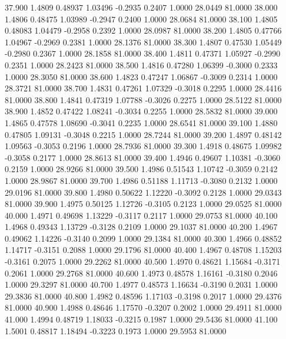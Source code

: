   37.900   1.4809   0.48937   1.03496  -0.2935   0.2407   1.0000  28.0449  81.0000
  38.000   1.4806   0.48475   1.03989  -0.2947   0.2400   1.0000  28.0684  81.0000
  38.100   1.4805   0.48083   1.04479  -0.2958   0.2392   1.0000  28.0987  81.0000
  38.200   1.4805   0.47766   1.04967  -0.2969   0.2381   1.0000  28.1376  81.0000
  38.300   1.4807   0.47530   1.05449  -0.2980   0.2367   1.0000  28.1858  81.0000
  38.400   1.4811   0.47371   1.05927  -0.2990   0.2351   1.0000  28.2423  81.0000
  38.500   1.4816   0.47280   1.06399  -0.3000   0.2333   1.0000  28.3050  81.0000
  38.600   1.4823   0.47247   1.06867  -0.3009   0.2314   1.0000  28.3721  81.0000
  38.700   1.4831   0.47261   1.07329  -0.3018   0.2295   1.0000  28.4416  81.0000
  38.800   1.4841   0.47319   1.07788  -0.3026   0.2275   1.0000  28.5122  81.0000
  38.900   1.4852   0.47422   1.08241  -0.3034   0.2255   1.0000  28.5832  81.0000
  39.000   1.4865   0.47578   1.08690  -0.3041   0.2235   1.0000  28.6541  81.0000
  39.100   1.4880   0.47805   1.09131  -0.3048   0.2215   1.0000  28.7244  81.0000
  39.200   1.4897   0.48142   1.09563  -0.3053   0.2196   1.0000  28.7936  81.0000
  39.300   1.4918   0.48675   1.09982  -0.3058   0.2177   1.0000  28.8613  81.0000
  39.400   1.4946   0.49607   1.10381  -0.3060   0.2159   1.0000  28.9266  81.0000
  39.500   1.4986   0.51543   1.10742  -0.3059   0.2142   1.0000  28.9867  81.0000
  39.700   1.4986   0.51188   1.11713  -0.3080   0.2132   1.0000  29.0196  81.0000
  39.800   1.4980   0.50622   1.12220  -0.3092   0.2128   1.0000  29.0343  81.0000
  39.900   1.4975   0.50125   1.12726  -0.3105   0.2123   1.0000  29.0525  81.0000
  40.000   1.4971   0.49698   1.13229  -0.3117   0.2117   1.0000  29.0753  81.0000
  40.100   1.4968   0.49343   1.13729  -0.3128   0.2109   1.0000  29.1037  81.0000
  40.200   1.4967   0.49062   1.14226  -0.3140   0.2099   1.0000  29.1384  81.0000
  40.300   1.4966   0.48852   1.14717  -0.3151   0.2088   1.0000  29.1796  81.0000
  40.400   1.4967   0.48708   1.15203  -0.3161   0.2075   1.0000  29.2262  81.0000
  40.500   1.4970   0.48621   1.15684  -0.3171   0.2061   1.0000  29.2768  81.0000
  40.600   1.4973   0.48578   1.16161  -0.3180   0.2046   1.0000  29.3297  81.0000
  40.700   1.4977   0.48573   1.16634  -0.3190   0.2031   1.0000  29.3836  81.0000
  40.800   1.4982   0.48596   1.17103  -0.3198   0.2017   1.0000  29.4376  81.0000
  40.900   1.4988   0.48646   1.17570  -0.3207   0.2002   1.0000  29.4911  81.0000
  41.000   1.4994   0.48719   1.18033  -0.3215   0.1987   1.0000  29.5436  81.0000
  41.100   1.5001   0.48817   1.18494  -0.3223   0.1973   1.0000  29.5953  81.0000
